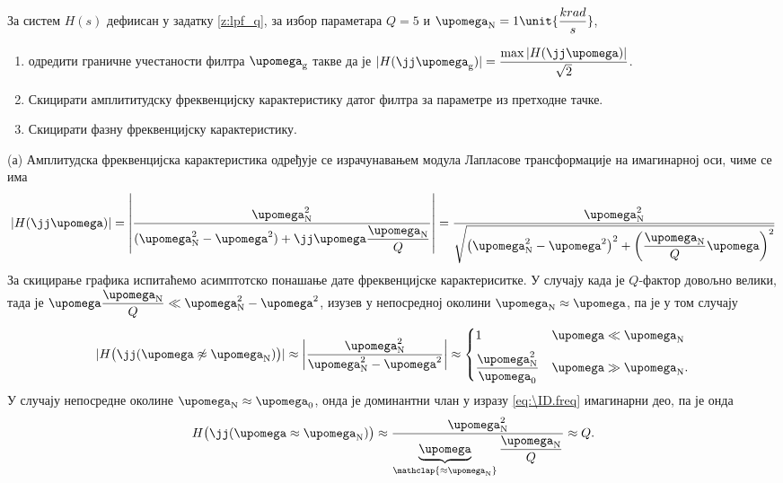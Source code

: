 \PID \mnImportant
За систем $H(s)$ дефиисан у задатку \ref{z:lpf_q}, за избор параметара 
$Q = 5$ и $\upomega_{\rm N} = 1\unit{\dfrac{krad}{s}}$,
\begin{enumerate}[label=(\alph*)]
    \item одредити граничне учестаности филтра $\upomega_{\rm g}$ такве да је
    $|H(\jj\upomega_{\rm g})| = \dfrac{\max|H(\jj\upomega)|}{\sqrt 2}$.
    \item Скицирати амплититудску фреквенцијску карактеристику датог филтра за параметре из претходне тачке. 
    \item Скицирати фазну фреквенцијску карактеристику. 
\end{enumerate}

\RESENJE 
(а) Амплитудска фреквенцијска карактеристика одређује се израчунавањем модула Лапласове трансформације 
на имагинарној оси, чиме се има 
\begin{equation}
    |H(\jj\upomega)| =
    \left|
    \dfrac{\upomega_{\rm N}^2 }{(\upomega_{\rm N}^2 - \upomega^2) + \jj\upomega\dfrac{\upomega_{\rm N}}{Q}} 
    \right| 
    =
    \dfrac{\upomega_{\rm N}^2}{\sqrt{  
        \left(\upomega_{\rm N}^2 - \upomega^2\right)^2 
        +
        \left(
            \dfrac{\upomega_{\rm N}}{Q} \upomega
        \right)^2
    }}
    \label{eq:\ID.freq}
\end{equation}
За скицирање графика испитаћемо асимптотско понашање дате фреквенцијске карактериситке. 
У случају када је $Q$-фактор довољно велики, тада је 
$\upomega\dfrac{\upomega_{\rm N}}{Q} \ll \upomega_{\rm N}^2 - \upomega^2$, изузев у непосредној околини 
$\upomega_{\rm N} \approx \upomega$, па је у том случају
\begin{equation}
    | H \bigl( \jj(\upomega \not \approx \upomega_{\rm N}) \bigr) |\approx
    \left|
    \dfrac{\upomega_{\rm N}^2}{\upomega_{\rm N}^2 - \upomega^2}
    \right|
    \approx \begin{cases}
        1 & \upomega \ll \upomega_{\rm N} \\[2mm]
        \dfrac{\upomega_{\rm N}^2}{\upomega_0} & \upomega \gg \upomega_{\rm N}.
    \end{cases}
    \label{fig:\ID.outband}
\end{equation} 
У случају непосредне околине $\upomega_{\rm N}\approx \upomega_{0}$, онда је доминантни члан у изразу
\ref{eq:\ID.freq} имагинарни део, па је онда 
\begin{equation}
    H \bigl( \jj(\upomega \approx \upomega_{\rm N}) \bigr) \approx 
    \dfrac{\upomega_{\rm N}^2}{\underbrace{\upomega}_{\mathclap{\approx \upomega_{\rm N}}}\dfrac{\upomega_{\rm N}}{Q} }
    \approx Q. \label{fig:\ID.maxval}
\end{equation}
